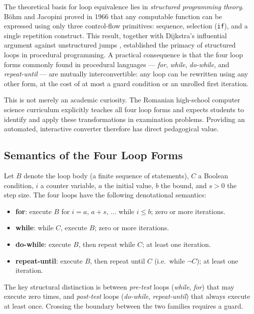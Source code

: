 The theoretical basis for loop equivalence lies in \textit{structured programming
theory}.  Böhm and Jacopini proved in 1966 \cite{bohm-jacopini} that any computable
function can be expressed using only three control-flow primitives: sequence,
selection (\texttt{if}), and a single repetition construct.  This result, together
with Dijkstra's influential argument against unstructured jumps \cite{dijkstra1968goto},
established the primacy of structured loops in procedural programming.
A practical consequence is that the four loop forms commonly found in procedural
languages --- \textit{for}, \textit{while}, \textit{do-while}, and
\textit{repeat-until} --- are mutually interconvertible: any loop can be rewritten using any other form, at the
cost of at most a guard condition or an unrolled first iteration.

This is not merely an academic curiosity.  The Romanian high-school computer science
curriculum explicitly teaches all four loop forms and expects students to
identify and apply these transformations in examination problems.
Providing an automated, interactive converter therefore has direct pedagogical value.

\subsection{Semantics of the Four Loop Forms}

Let $B$ denote the loop body (a finite sequence of statements), $C$ a Boolean
condition, $i$ a counter variable, $a$ the initial value, $b$ the bound, and $s > 0$
the step size.  The four loops have the following denotational semantics:

\begin{itemize}
  \item \textbf{for}: execute $B$ for $i = a,\, a{+}s,\, \ldots$ while $i \leq b$;
        zero or more iterations.
  \item \textbf{while}: while $C$, execute $B$; zero or more iterations.
  \item \textbf{do-while}: execute $B$, then repeat while $C$; at least one
        iteration.
  \item \textbf{repeat-until}: execute $B$, then repeat until $C$
        (i.e.\ while $\neg C$); at least one iteration.
\end{itemize}

The key structural distinction is between \textit{pre-test} loops (\textit{while},
\textit{for}) that may execute zero times, and \textit{post-test} loops
(\textit{do-while}, \textit{repeat-until}) that always execute at least once.
Crossing the boundary between the two families requires a guard.


